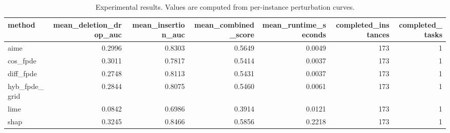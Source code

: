 \begin{table}[t]
\caption{Experimental results. Values are computed from per-instance perturbation curves.}
\label{tab:main_results_computed}
\centering
\begin{tabular}{lrrrrrr}
\toprule
method & mean\_deletion\_drop\_auc & mean\_insertion\_auc & mean\_combined\_score & mean\_runtime\_seconds & completed\_instances & completed\_tasks \\
\midrule
aime & 0.2996 & 0.8303 & 0.5649 & 0.0049 & 173 & 1 \\
cos\_fpde & 0.3011 & 0.7817 & 0.5414 & 0.0037 & 173 & 1 \\
diff\_fpde & 0.2748 & 0.8113 & 0.5431 & 0.0037 & 173 & 1 \\
hyb\_fpde\_grid & 0.2844 & 0.8075 & 0.5460 & 0.0061 & 173 & 1 \\
lime & 0.0842 & 0.6986 & 0.3914 & 0.0121 & 173 & 1 \\
shap & 0.3245 & 0.8466 & 0.5856 & 0.2218 & 173 & 1 \\
\bottomrule
\end{tabular}

\end{table}
